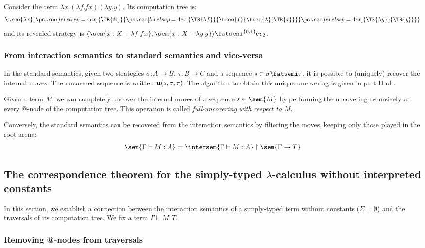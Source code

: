 \begin{exmp}
Consider the term $\lambda x . (\lambda f . f x) (\lambda y . y)$.
Its computation tree is:
$$
\tree{\lambda x} {
    \pstree[levelsep=4ex]{\TR{@}}
    {       \pstree[levelsep=4ex]{\TR{\lambda f}}
                { \tree{f}{  \tree{\lambda}{ \TR{x}  } } }
            \pstree[levelsep=4ex]{\TR{\lambda y}}
                    {\TR{y}}
    } }
$$
and its revealed strategy is $\langle \sem{ x:X \vdash \lambda f . f
x} , \sem{ x:X \vdash \lambda y . y} \rangle \fatsemi^{\{0,1\}}
ev_2$.
\end{exmp}


\subsubsection{From interaction semantics to standard semantics and vice-versa}

In the standard semantics, given two strategies $\sigma : A \rightarrow B$, $\tau : B \rightarrow C$ and
a sequence $s \in \sigma \fatsemi \tau$, it is possible to (uniquely) recover the internal moves. The uncovered sequence is written
${\bf u}(s, \sigma, \tau)$. The algorithm to obtain this unique uncovering is given in part II of \cite{hylandong_pcf}.

Given a term $M$, we can completely uncover the internal moves of a
sequence $s\in\sem{M}$ by performing the uncovering recursively at
every @-node of the computation tree. This operation is called
\emph{full-uncovering with respect to $M$}.

Conversely, the standard semantics can be recovered from the
interaction semantics by filtering the moves, keeping only those
played in the root arena:
\begin{eqnarray}
 \sem{\Gamma \vdash M : A} = \intersem{\Gamma \vdash M : A} \upharpoonright \sem{\Gamma \rightarrow T} \label{eqn:int_std_gamsem}
\end{eqnarray}

\subsection{The correspondence theorem for the simply-typed $\lambda$-calculus without interpreted constants}
In this section, we establish a
connection between the interaction semantics of a simply-typed term without constants ($\Sigma = \emptyset$)
and the traversals of its computation tree. We fix a term $\Gamma \vdash M : T$.

\subsubsection{Removing @-nodes from traversals}

